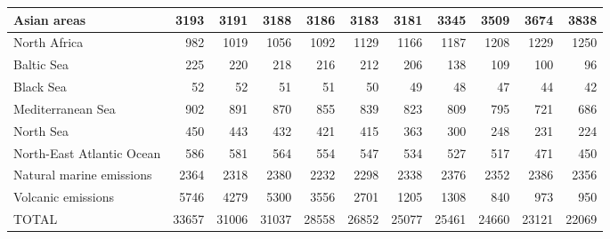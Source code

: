 \begin{table}
\begin{tabular}{|l|r|r|r|r|r|r|r|r|r|r|}
                   Asian areas&   3193&   3191&   3188&   3186&   3183&   3181&   3345&   3509&   3674&   3838\\\hline
                  North Africa&    982&   1019&   1056&   1092&   1129&   1166&   1187&   1208&   1229&   1250\\\hline
                    Baltic Sea&    225&    220&    218&    216&    212&    206&    138&    109&    100&     96\\\hline
                     Black Sea&     52&     52&     51&     51&     50&     49&     48&     47&     44&     42\\\hline
             Mediterranean Sea&    902&    891&    870&    855&    839&    823&    809&    795&    721&    686\\\hline
                     North Sea&    450&    443&    432&    421&    415&    363&    300&    248&    231&    224\\\hline
     North-East Atlantic Ocean&    586&    581&    564&    554&    547&    534&    527&    517&    471&    450\\\hline
      Natural marine emissions&   2364&   2318&   2380&   2232&   2298&   2338&   2376&   2352&   2386&   2356\\\hline
            Volcanic emissions&   5746&   4279&   5300&   3556&   2701&   1205&   1308&    840&    973&    950\\\hline\hline
                         TOTAL&  33657&  31006&  31037&  28558&  26852&  25077&  25461&  24660&  23121&  22069\\\hline
 \end{tabular}
 \end{table}
 
